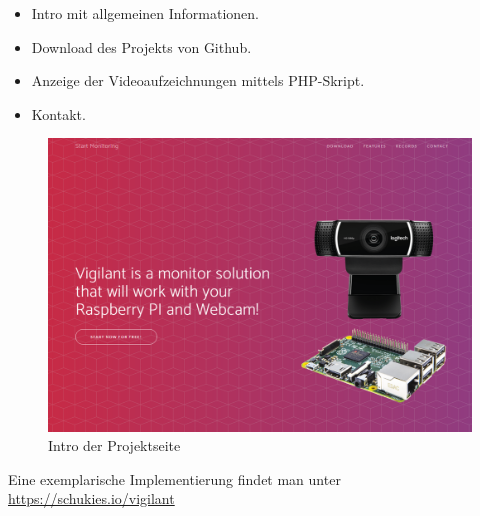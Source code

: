 \begin{description}
   \begin{itemize}
      \item Intro mit allgemeinen Informationen.
      \item Download des Projekts von Github.
      \item Anzeige der Videoaufzeichnungen mittels PHP-Skript.
      \item Kontakt.
   \end{itemize}
\end{description}
\begin{figure}[htb]
  \centering
    \includegraphics[width=1.0\textwidth]{images/vigilant}
    \caption{Intro der Projektseite}
\end{figure}
Eine exemplarische Implementierung findet man unter  {\href{https://www.schukies.io/vigilant}{https://schukies.io/vigilant}}








